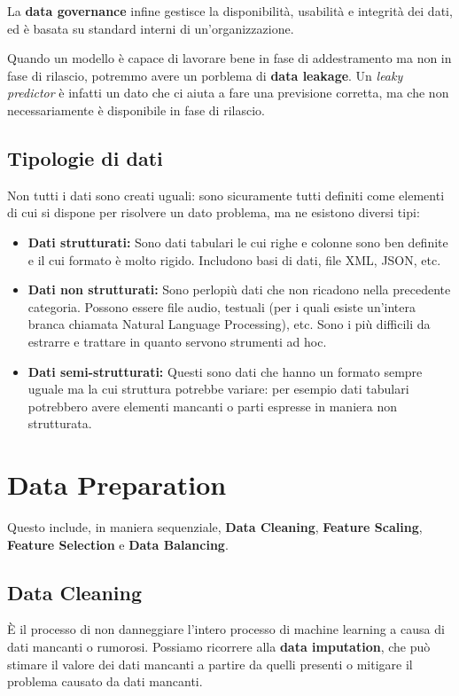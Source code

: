     La \textbf{data governance} infine gestisce la disponibilità, usabilità e integrità dei dati, ed è basata su standard interni di un'organizzazione.
    
    Quando un modello è capace di lavorare bene in fase di addestramento ma non in fase di rilascio, potremmo avere un porblema di \textbf{data leakage}. Un \textit{leaky predictor} è infatti un dato che ci aiuta a fare una previsione corretta, ma che non necessariamente è disponibile in fase di rilascio. 
    
    \subsection{Tipologie di dati}
        Non tutti i dati sono creati uguali: sono sicuramente tutti definiti come elementi di cui si dispone per risolvere un dato problema, ma ne esistono diversi tipi:
        \begin{itemize}
            \item \textbf{Dati strutturati:} Sono dati tabulari le cui righe e colonne sono ben definite e il cui formato è molto rigido. Includono basi di dati, file XML, JSON, etc.
            
            \item \textbf{Dati non strutturati:} Sono perlopiù dati che non ricadono nella precedente categoria. Possono essere file audio, testuali (per i quali esiste un'intera branca chiamata Natural Language Processing), etc. Sono i più difficili da estrarre e trattare in quanto servono strumenti ad hoc.
            
            \item \textbf{Dati semi-strutturati:} Questi sono dati che hanno un formato sempre uguale ma la cui struttura potrebbe variare: per esempio dati tabulari potrebbero avere elementi mancanti o parti espresse in maniera non strutturata.
        \end{itemize}
        
\section{Data Preparation}
    Questo include, in maniera sequenziale, \textbf{Data Cleaning}, \textbf{Feature Scaling}, \textbf{Feature Selection} e \textbf{Data Balancing}.
    
    \subsection{Data Cleaning}
        È il processo di non danneggiare l'intero processo di machine learning a causa di dati mancanti o rumorosi. Possiamo ricorrere alla \textbf{data imputation}, che può stimare il valore dei dati mancanti a partire da quelli presenti o mitigare il problema causato da dati mancanti.
        
